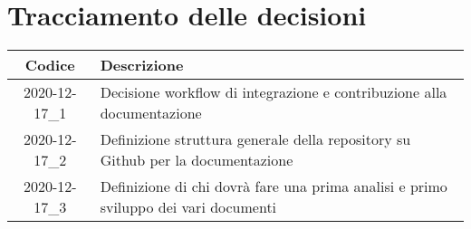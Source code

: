 \section*{Tracciamento delle decisioni}

\begin{center}
	\begin{longtable}{|c|p{12.25cm}|}
	\hline
	\rowcolor{lighter-grayer}
	\textbf{Codice} & \textbf{Descrizione} \\
	\hline
	\endfirsthead

	\hline
	2020-12-17\_1 & Decisione workflow di integrazione e contribuzione alla documentazione\\
	\hline
	2020-12-17\_2 & Definizione struttura generale della repository su Github per la documentazione\\
	\hline
	2020-12-17\_3 & Definizione di chi dovrà fare una prima analisi e primo sviluppo dei vari documenti \\
	\hline
	\end{longtable}
\end{center}
